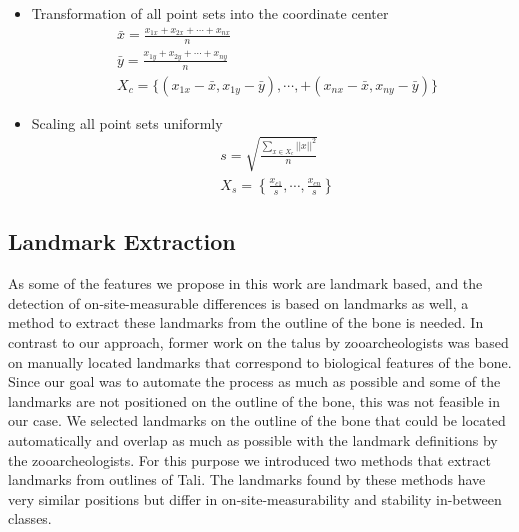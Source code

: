 \documentclass[pdftex,12pt,a4paper]{report}
\begin{document}
\begin{itemize}
	\item Transformation of all point sets into the coordinate center
	\begin{equation}
		\begin{split}
			& \bar{x} = \frac{x_{1x} + x_{2x} + \cdots + x_{nx}}{n} \\
			& \bar{y} = \frac{x_{1y} + x_{2y} + \cdots + x_{ny}}{n} \\
			& X_c = \{ (x_{1x} - \bar{x}, x_{1y} - \bar{y}), \cdots, + (x_{nx} - \bar{x}, x_{ny} - \bar{y}) \}
		\end{split} 
	\end{equation}
	\item Scaling all point sets uniformly
	\begin{equation}
		\begin{split}
			& s = \sqrt{\frac{\sum\limits_{x \in X_c}||x||^2}{n}} \\
			& X_s = \left\{ \frac{x_{c1}}{s}, \cdots, \frac{x_{cn}}{s}\right\}
		\end{split}
	\end{equation}
\end{itemize}

\subsection{Landmark Extraction}
\label{sub:landmarks}

As some of the features we propose in this work are landmark based, and the detection of on-site-measurable differences
is based on landmarks as well, a method to extract these landmarks from the outline of the bone is needed. In contrast to
our approach, former work on the talus by zooarcheologists was based on manually located landmarks that correspond to
biological features of the bone. Since our goal was to automate the process as much as possible and some of the landmarks
are not positioned on the outline of the bone, this was not feasible in our case. We selected landmarks on the outline
of the bone that could be located automatically and overlap as much as possible with the landmark definitions by the
zooarcheologists. For this purpose we introduced two methods that extract landmarks from outlines of Tali. The landmarks
found by these methods have very similar positions but differ in on-site-measurability and stability in-between classes.
\end{document}
